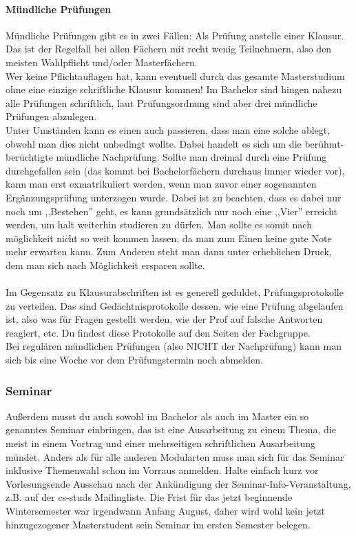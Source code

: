 \begin{multicols}{2}
\paragraph*{Mündliche Prüfungen}
Mündliche Prüfungen gibt es in zwei Fällen: Als Prüfung anstelle einer
Klausur. Das ist der Regelfall bei allen Fächern mit recht wenig
Teilnehmern, also den meisten Wahlpflicht und/oder Masterfächern. \\ 
 Wer keine Pflichtauflagen hat, kann eventuell durch das gesamte
 Masterstudium ohne eine einzige schriftliche Klausur kommen! 
Im Bachelor sind hingen nahezu alle Prüfungen schriftlich, laut
 Prüfungsordnung sind aber drei mündliche Prüfungen abzulegen. \\
Unter Umständen kann es einen auch passieren, dass man eine solche
ablegt, obwohl man dies nicht unbedingt wollte. Dabei handelt es sich
um die berühmt-berüchtigte mündliche Nachprüfung. Sollte man dreimal
durch eine Prüfung durchgefallen sein (das kommt bei Bachelorfächern
durchaus immer wieder vor), kann man erst exmatrikuliert werden, wenn
man zuvor einer sogenannten Ergänzungsprüfung unterzogen wurde. Dabei
ist zu beachten, dass es dabei nur noch um ,,Bestehen'' geht, es kann
grundsätzlich nur noch eine ,,Vier''  erreicht werden, um halt
weiterhin studieren zu dürfen. Man sollte es somit nach möglichkeit
nicht so weit kommen lassen, da man zum Einen keine gute Note mehr
erwarten kann. Zum Anderen steht man dann unter erheblichen Druck, dem
man sich nach Möglichkeit ersparen sollte.\\\\
Im Gegensatz zu Klausurabschriften ist es generell geduldet,
Prüfungsprotokolle zu verteilen. Das sind Gedächtnisprotokolle dessen,
wie eine Prüfung abgelaufen ist, also was für Fragen gestellt werden,
wie der Prof auf falsche Antworten reagiert, etc. Du findest diese
Protokolle auf den Seiten der Fachgruppe.\\
Bei regulären mündlichen Prüfungen (also NICHT der Nachprüfung) kann
man sich bis eine Woche vor dem Prüfungstermin noch abmelden.
\subsubsection{Seminar}
Außerdem musst du auch sowohl im Bachelor als auch im Master ein so genanntes Seminar einbringen, das ist eine Ausarbeitung zu einem Thema, die meist in einem Vortrag und einer mehrseitigen schriftlichen Ausarbeitung mündet. Anders als für alle anderen Modularten muss man sich für das Seminar inklusive Themenwahl schon im Vorraus anmelden. Halte einfach kurz vor Vorlesungsende Ausschau nach der Ankündigung der Seminar-Info-Veranstaltung, z.B. auf der cs-studs Mailingliste. Die Frist für das jetzt beginnende Wintersemester war irgendwann Anfang August, daher wird wohl kein jetzt hinzugezogener Masterstudent sein Seminar im ersten Semester belegen.


\end{multicols}
